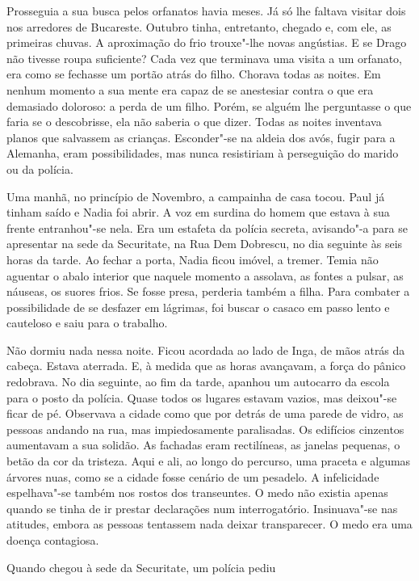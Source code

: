 Prosseguia a sua busca pelos orfanatos havia meses. Já só lhe faltava
visitar dois nos arredores de Bucareste. Outubro tinha, entretanto,
chegado e, com ele, as primeiras chuvas. A aproximação do frio
trouxe"-lhe novas angústias. E se Drago não tivesse roupa suficiente?
Cada vez que terminava uma visita a um orfanato, era como se fechasse um
portão atrás do filho. Chorava todas as noites. Em nenhum momento a sua
mente era capaz de se anestesiar contra o que era demasiado doloroso:
a perda de um filho. Porém, se alguém lhe perguntasse o que faria se o
descobrisse, ela não saberia o que dizer. Todas as noites inventava
planos que salvassem as crianças. Esconder"-se na aldeia dos avós, fugir
para a Alemanha, eram possibilidades, mas nunca resistiriam à
perseguição do marido ou da polícia.

Uma manhã, no princípio de Novembro, a campainha
de casa tocou. Paul já tinham saído e Nadia foi abrir. A voz em surdina
do homem que estava à sua frente entranhou"-se nela. Era um estafeta da polícia secreta, avisando"-a para se
apresentar na sede da Securitate, na Rua Dem Dobrescu, no dia seguinte
às seis horas da tarde. Ao fechar a porta, Nadia ficou imóvel, a tremer.
Temia não aguentar
o abalo interior que naquele momento a assolava, as fontes a pulsar, as
náuseas, os suores frios. Se fosse presa, perderia também a filha. Para
combater a possibilidade de se desfazer em lágrimas, foi buscar o
casaco em passo lento e cauteloso e saiu para o trabalho.

Não dormiu nada nessa noite. Ficou acordada ao lado de Inga, de mãos
atrás da cabeça. Estava aterrada. E, à medida que as horas avançavam, a
força do pânico redobrava. No dia seguinte, ao fim da tarde, apanhou
um autocarro da escola para o posto da polícia. Quase todos os lugares
estavam vazios, mas deixou"-se ficar de pé. Observava a cidade como que
por detrás de uma parede de vidro, as pessoas andando na rua, mas
impiedosamente paralisadas. Os edifícios cinzentos aumentavam a sua
solidão. As fachadas eram rectilíneas, as janelas pequenas, o betão da
cor da tristeza. Aqui e ali, ao longo do percurso, uma praceta e
algumas árvores nuas, como se a cidade fosse cenário de um pesadelo. A
infelicidade espelhava"-se também nos rostos dos transeuntes. O medo
não existia apenas quando se tinha de ir prestar declarações num
interrogatório. Insinuava"-se nas atitudes, embora as pessoas tentassem
nada deixar transparecer. O medo era uma doença contagiosa.

Quando chegou à sede da Securitate, um polícia pediu

